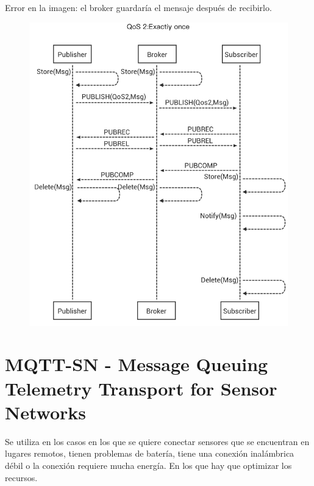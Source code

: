 \documentclass[12pt, twoside, openright]{report} %
\begin{document}
\begin{description}
	      Error en la imagen: el broker guardaría el mensaje después de recibirlo.
	      \begin{figure}[H]
		      {\includegraphics[scale=.2]{0_G6zwc_VftJ4AcueS.png}}
	      \end{figure}
\end{description}
\pagebreak
\section{MQTT-SN - Message Queuing Telemetry Transport for Sensor Networks}
Se utiliza en los casos en los que se quiere conectar sensores que se encuentran en lugares remotos, tienen problemas de batería, tiene una conexión inalámbrica débil o la conexión requiere mucha energía. En los que hay que optimizar los recursos.
\end{document}
